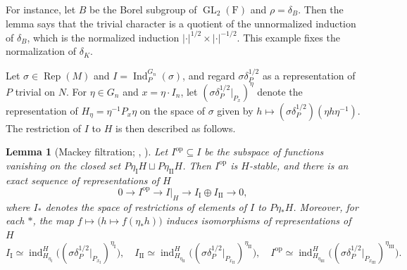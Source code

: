 \documentclass[11pt]{amsart}
\numberwithin{equation}{section}
\theoremstyle{plain}
\newtheorem{lemma}[theorem]{Lemma}
\theoremstyle{definition}
\theoremstyle{remark}
\DeclareMathOperator{\GL}{GL}
\DeclareMathOperator{\Rep}{Rep}
\DeclareMathOperator{\Ind}{Ind}
\DeclareMathOperator{\ind}{ind}
\begin{document}
For instance, let $B$ be the Borel subgroup of $\GL_2(\mathrm{F})$ and $\rho=\delta_B$. Then the lemma says that the trivial character is a quotient of the unnormalized induction of $\delta_B$, which is the normalized induction $|\cdot|^{1/2}\times|\cdot|^{-1/2}$. This example fixes the normalization of $\delta_K$.

Let $\sigma\in\Rep(M)$ and $I=\Ind_P^{G_n}(\sigma)$, and regard $\sigma\delta_P^{1/2}$ as a representation of $P$ trivial on $N$. For $\eta\in G_n$ and $x=\eta\cdot I_n$, let $(\sigma\delta_P^{1/2}|_{P_x})^\eta$ denote the representation of $H_\eta=\eta^{-1}P_x\eta$ on the space of $\sigma$ given by $h\mapsto(\sigma\delta_P^{1/2})(\eta h\eta^{-1})$. The restriction of $I$ to $H$ is then described as follows.

\begin{lemma}[Mackey filtration; {\cite[\S4, (4)]{Off17}}, {\cite[Theorem 5.2]{BZ77}}]\label{lem:mackey}
	Let $I^{\mathrm{op}}\subseteq I$ be the subspace of functions vanishing on the closed set $P\eta_{\mathrm I}H\sqcup P\eta_{\mathrm{II}}H$. Then $I^{\mathrm{op}}$ is $H$-stable, and there is an exact sequence of representations of $H$
	$$
	0\longrightarrow I^{\mathrm{op}}\longrightarrow I|_H\longrightarrow I_{\mathrm I}\oplus I_{\mathrm{II}}\longrightarrow0,
	$$
	where $I_*$ denotes the space of restrictions of elements of $I$ to $P\eta_*H$. Moreover, for each $*$, the map $f\mapsto\big(h\mapsto f(\eta_*h)\big)$ induces isomorphisms of representations of $H$
	$$
	I_{\mathrm I}\simeq\ind_{H_{\eta_{\mathrm I}}}^H\big((\sigma\delta_P^{1/2}|_{P_{x_{\mathrm I}}})^{\eta_{\mathrm I}}\big),\quad I_{\mathrm{II}}\simeq\ind_{H_{\eta_{\mathrm{II}}}}^H\big((\sigma\delta_P^{1/2}|_{P_{x_{\mathrm{II}}}})^{\eta_{\mathrm{II}}}\big),\quad I^{\mathrm{op}}\simeq\ind_{H_{\eta_{\mathrm{III}}}}^H\big((\sigma\delta_P^{1/2}|_{P_{x_{\mathrm{III}}}})^{\eta_{\mathrm{III}}}\big).
	$$
\end{lemma}
\end{document}
